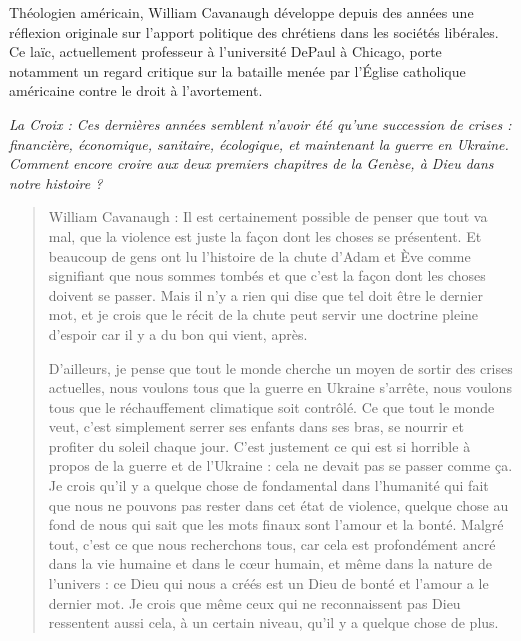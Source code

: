 \begin{Synthesis}
    
Théologien américain, William Cavanaugh développe depuis des années une réflexion originale sur l’apport politique des chrétiens dans les sociétés libérales. Ce laïc, actuellement professeur à l’université DePaul à Chicago, porte notamment un regard critique sur la bataille menée par l’Église catholique américaine contre le droit à l’avortement.
\end{Synthesis}
 
 
\textit{ 
La Croix : Ces dernières années semblent n’avoir été qu’une succession de crises : financière, économique, sanitaire, écologique, et maintenant la guerre en Ukraine. Comment encore croire aux deux premiers chapitres de la Genèse, à Dieu dans notre histoire ?
}

\begin{quote}
    William Cavanaugh : Il est certainement possible de penser que tout va mal, que la violence est juste la façon dont les choses se présentent. Et beaucoup de gens ont lu l’histoire de la chute d’Adam et Ève comme signifiant que nous sommes tombés et que c’est la façon dont les choses doivent se passer. Mais il n’y a rien qui dise que tel doit être le dernier mot, et je crois que le récit de la chute peut servir une doctrine pleine d’espoir car il y a du bon qui vient, après.

D’ailleurs, je pense que tout le monde cherche un moyen de sortir des crises actuelles, nous voulons tous que la guerre en Ukraine s’arrête, nous voulons tous que le réchauffement climatique soit contrôlé. Ce que tout le monde veut, c’est simplement serrer ses enfants dans ses bras, se nourrir et profiter du soleil chaque jour. C’est justement ce qui est si horrible à propos de la guerre et de l’Ukraine : cela ne devait pas se passer comme ça. Je crois qu’il y a quelque chose de fondamental dans l’humanité qui fait que nous ne pouvons pas rester dans cet état de violence, quelque chose au fond de nous qui sait que les mots finaux sont l’amour et la bonté. Malgré tout, c’est ce que nous recherchons tous, car cela est profondément ancré dans la vie humaine et dans le cœur humain, et même dans la nature de l’univers : ce Dieu qui nous a créés est un Dieu de bonté et l’amour a le dernier mot. Je crois que même ceux qui ne reconnaissent pas Dieu ressentent aussi cela, à un certain niveau, qu’il y a quelque chose de plus.

\end{quote}


